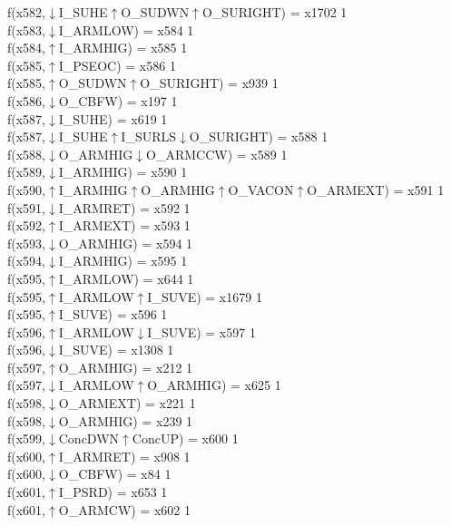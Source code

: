 f(x582,$\downarrow$I\_SUHE$\uparrow$O\_SUDWN$\uparrow$O\_SURIGHT) = x1702 {1} \\
f(x583,$\downarrow$I\_ARMLOW) = x584 {1} \\
f(x584,$\uparrow$I\_ARMHIG) = x585 {1} \\
f(x585,$\uparrow$I\_PSEOC) = x586 {1} \\
f(x585,$\uparrow$O\_SUDWN$\uparrow$O\_SURIGHT) = x939 {1} \\
f(x586,$\downarrow$O\_CBFW) = x197 {1} \\
f(x587,$\downarrow$I\_SUHE) = x619 {1} \\
f(x587,$\downarrow$I\_SUHE$\uparrow$I\_SURLS$\downarrow$O\_SURIGHT) = x588 {1} \\
f(x588,$\downarrow$O\_ARMHIG$\downarrow$O\_ARMCCW) = x589 {1} \\
f(x589,$\downarrow$I\_ARMHIG) = x590 {1} \\
f(x590,$\uparrow$I\_ARMHIG$\uparrow$O\_ARMHIG$\uparrow$O\_VACON$\uparrow$O\_ARMEXT) = x591 {1} \\
f(x591,$\downarrow$I\_ARMRET) = x592 {1} \\
f(x592,$\uparrow$I\_ARMEXT) = x593 {1} \\
f(x593,$\downarrow$O\_ARMHIG) = x594 {1} \\
f(x594,$\downarrow$I\_ARMHIG) = x595 {1} \\
f(x595,$\uparrow$I\_ARMLOW) = x644 {1} \\
f(x595,$\uparrow$I\_ARMLOW$\uparrow$I\_SUVE) = x1679 {1} \\
f(x595,$\uparrow$I\_SUVE) = x596 {1} \\
f(x596,$\uparrow$I\_ARMLOW$\downarrow$I\_SUVE) = x597 {1} \\
f(x596,$\downarrow$I\_SUVE) = x1308 {1} \\
f(x597,$\uparrow$O\_ARMHIG) = x212 {1} \\
f(x597,$\downarrow$I\_ARMLOW$\uparrow$O\_ARMHIG) = x625 {1} \\
f(x598,$\downarrow$O\_ARMEXT) = x221 {1} \\
f(x598,$\downarrow$O\_ARMHIG) = x239 {1} \\
f(x599,$\downarrow$ConcDWN$\uparrow$ConcUP) = x600 {1} \\
f(x600,$\uparrow$I\_ARMRET) = x908 {1} \\
f(x600,$\downarrow$O\_CBFW) = x84 {1} \\
f(x601,$\uparrow$I\_PSRD) = x653 {1} \\
f(x601,$\uparrow$O\_ARMCW) = x602 {1} \\

